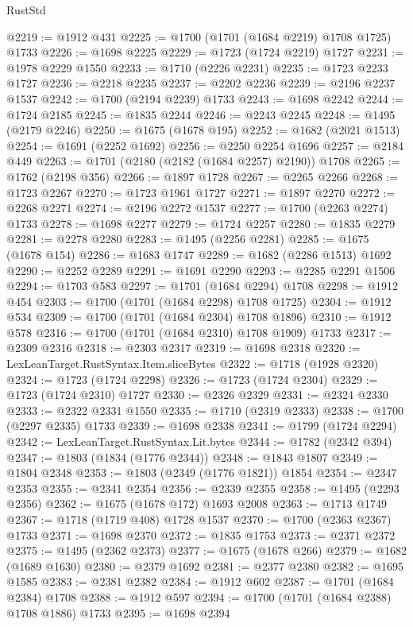 \begin{lexlean}{RustStd}
\begin{coremodule}
@2219 := @1912 @431
@2225 := @1700 (@1701 (@1684 @2219) @1708 @1725) @1733
@2226 := @1698 @2225
@2229 := @1723 (@1724 @2219) @1727
@2231 := @1978 @2229 @1550
@2233 := @1710 (@2226 @2231)
@2235 := @1723 @2233 @1727
@2236 := @2218 @2235
@2237 := @2202 @2236
@2239 := @2196 @2237 @1537
@2242 := @1700 (@2194 @2239) @1733
@2243 := @1698 @2242
@2244 := @1724 @2185
@2245 := @1835 @2244
@2246 := @2243 @2245
@2248 := @1495 (@2179 @2246)
@2250 := @1675 (@1678 @195)
@2252 := @1682 (@2021 @1513)
@2254 := @1691 (@2252 @1692)
@2256 := @2250 @2254 @1696
@2257 := @2184 @449
@2263 := @1701 (@2180 (@2182 (@1684 @2257) @2190)) @1708
@2265 := @1762 (@2198 @356)
@2266 := @1897 @1728
@2267 := @2265 @2266
@2268 := @1723 @2267
@2270 := @1723 @1961 @1727
@2271 := @1897 @2270
@2272 := @2268 @2271
@2274 := @2196 @2272 @1537
@2277 := @1700 (@2263 @2274) @1733
@2278 := @1698 @2277
@2279 := @1724 @2257
@2280 := @1835 @2279
@2281 := @2278 @2280
@2283 := @1495 (@2256 @2281)
@2285 := @1675 (@1678 @154)
@2286 := @1683 @1747
@2289 := @1682 (@2286 @1513) @1692
@2290 := @2252 @2289
@2291 := @1691 @2290
@2293 := @2285 @2291 @1506
@2294 := @1703 @583
@2297 := @1701 (@1684 @2294) @1708
@2298 := @1912 @454
@2303 := @1700 (@1701 (@1684 @2298) @1708 @1725)
@2304 := @1912 @534
@2309 := @1700 (@1701 (@1684 @2304) @1708 @1896)
@2310 := @1912 @578
@2316 := @1700 (@1701 (@1684 @2310) @1708 @1909) @1733
@2317 := @2309 @2316
@2318 := @2303 @2317
@2319 := @1698 @2318
@2320 := LexLeanTarget.RustSyntax.Item.sliceBytes
@2322 := @1718 (@1928 @2320)
@2324 := @1723 (@1724 @2298)
@2326 := @1723 (@1724 @2304)
@2329 := @1723 (@1724 @2310) @1727
@2330 := @2326 @2329
@2331 := @2324 @2330
@2333 := @2322 @2331 @1550
@2335 := @1710 (@2319 @2333)
@2338 := @1700 (@2297 @2335) @1733
@2339 := @1698 @2338
@2341 := @1799 (@1724 @2294)
@2342 := LexLeanTarget.RustSyntax.Lit.bytes
@2344 := @1782 (@2342 @394)
@2347 := @1803 (@1834 (@1776 @2344))
@2348 := @1843 @1807
@2349 := @1804 @2348
@2353 := @1803 (@2349 (@1776 @1821)) @1854
@2354 := @2347 @2353
@2355 := @2341 @2354
@2356 := @2339 @2355
@2358 := @1495 (@2293 @2356)
@2362 := @1675 (@1678 @172) @1693 @2008
@2363 := @1713 @1749
@2367 := @1718 (@1719 @408) @1728 @1537
@2370 := @1700 (@2363 @2367) @1733
@2371 := @1698 @2370
@2372 := @1835 @1753
@2373 := @2371 @2372
@2375 := @1495 (@2362 @2373)
@2377 := @1675 (@1678 @266)
@2379 := @1682 (@1689 @1630)
@2380 := @2379 @1692
@2381 := @2377 @2380
@2382 := @1695 @1585
@2383 := @2381 @2382
@2384 := @1912 @602
@2387 := @1701 (@1684 @2384) @1708
@2388 := @1912 @597
@2394 := @1700 (@1701 (@1684 @2388) @1708 @1886) @1733
@2395 := @1698 @2394

\end{coremodule}
\end{lexlean}
